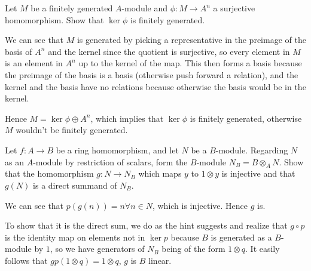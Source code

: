 \documentclass[a4paper]{exam}
\newif\ifhint
\begin{document}
\begin{questions}

	\question Let $M $ be a finitely generated $A $-module and $\phi :M\to A^n $ a surjective homomorphism. Show that $\ker \phi  $ is finitely generated.
	\ifhint
		Let $e_{1}, \ldots , e_n $ be a basis of $A^n $ and choose $u_i \in M $ such that $\phi (u_i) = e_i (1\le i\le n)$. Show that $M $ is the direct sum of $\ker \phi  $ and the submodule generated by $u_1, \ldots , u_n $.
	\fi
	\begin{solution}
		We can see that $M $ is generated by picking a representative in the preimage of the basis of $A^n $ and the kernel since the quotient is surjective, so every element in $M $ is an element in $A^n $ up to the kernel of the map.
		This then forms a basis because the preimage of the basis is a basis (otherwise push forward a relation), and the kernel and the basis have no relations because otherwise the basis would be in the kernel.

		Hence $M = \ker \phi \oplus A^n $, which implies that $\ker \phi  $ is finitely generated, otherwise $M $ wouldn't be finitely generated.
	\end{solution}

	\question Let $f: A\to B $ be a ring homomorphism, and let $N$ be a $B$-module. Regarding $N$ as an $A$-module by restriction of scalars, form the $B$-module $N_B = B \otimes _A N$. Show that the homomorphism $g: N \to N_B$ which maps $y$ to $1 \otimes  y$ is injective and that $g(N)$ is a direct summand of $N_B$.
	\ifhint
		Define $p: N_B \to N_b$ by $p(b \otimes y) = by$, and show that $N_B = \Im (g) \oplus \ker (p)$.
	\fi
	\begin{solution}
		We can see that $p(g(n)) = n \forall n \in N $, which is injective.
		Hence $g $ is.

		To show that it is the direct sum, we do as the hint suggests and realize that $g\circ p $ is the identity map on elements not in $\ker p $ because $B $ is generated as a $B $-module by $1 $, so we have generators of $N_B $ being of the form $1 \otimes q$.
		It easily follows that $gp(1 \otimes q) = 1 \otimes q $, $g$ is $B $ linear.


\end{solution}
\end{questions}
\end{document}
